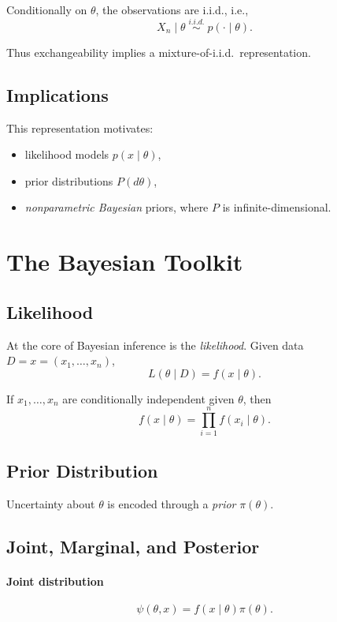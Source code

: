 \documentclass[12pt,oneside]{book}
\numberwithin{equation}{section}
\theoremstyle{definition}
\theoremstyle{plain}
\theoremstyle{remark}
\begin{document}
Conditionally on $\theta$, the observations are i.i.d., i.e.,
\[
X_n \mid \theta \;\stackrel{i.i.d.}{\sim}\; p(\cdot \mid \theta).
\]

Thus exchangeability implies a mixture-of-i.i.d.\ representation.

\subsection*{Implications}

This representation motivates:
\begin{itemize}
\item likelihood models $p(x \mid \theta)$,
\item prior distributions $P(d\theta)$,
\item \emph{nonparametric Bayesian} priors, where $P$ is infinite-dimensional.
\end{itemize}

\section{The Bayesian Toolkit}

\subsection{Likelihood}

At the core of Bayesian inference is the \emph{likelihood}. Given data $D = x = (x_1,\ldots,x_n)$,
\[
L(\theta \mid D) = f(x \mid \theta).
\]

If $x_1,\ldots,x_n$ are conditionally independent given $\theta$, then
\[
f(x \mid \theta) = \prod_{i=1}^n f(x_i \mid \theta).
\]

\subsection{Prior Distribution}

Uncertainty about $\theta$ is encoded through a \emph{prior} $\pi(\theta)$.

\subsection{Joint, Marginal, and Posterior}

\paragraph{Joint distribution}
\[
\psi(\theta, x) = f(x \mid \theta)\pi(\theta).
\]
\end{document}
